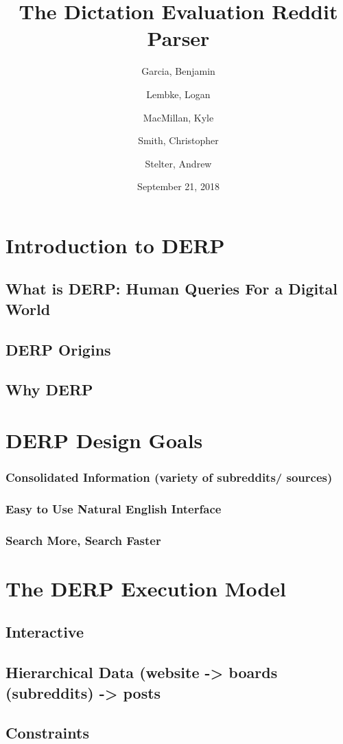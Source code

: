 \documentclass{article}
\title{The Dictation Evaluation Reddit Parser}
\author{
Garcia, Benjamin \and
Lembke, Logan \and 
MacMillan, Kyle  \and 
Smith, Christopher \and 
Stelter, Andrew 
}
\date{September 21, 2018}
\begin{document}
\maketitle

\section{Introduction to DERP}
\subsection{What is DERP: Human Queries For a Digital World}
\subsection{DERP Origins}
\subsection{Why DERP}

\section{DERP Design Goals}
\subsubsection{Consolidated Information (variety of subreddits/ sources)}
\subsubsection{Easy to Use Natural English Interface}
\subsubsection{Search More, Search Faster}

\section{The DERP Execution Model}
\subsection{Interactive}
\subsection{Hierarchical Data (website -> boards (subreddits) -> posts}
\subsection{Constraints}
\end{document}
